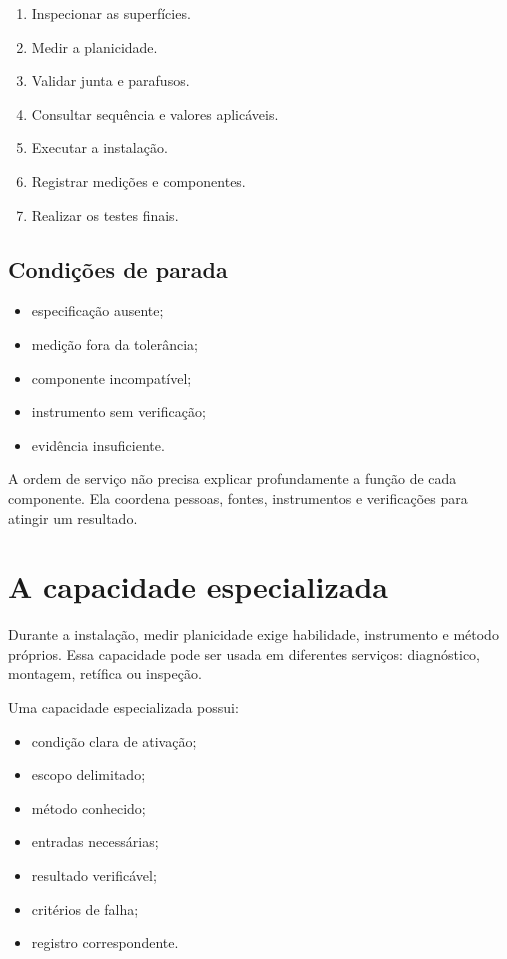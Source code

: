 \documentclass[
  10pt,
  a4paper,
  oneside]{book}
\providecommand{\tightlist}{%
  \setlength{\itemsep}{0pt}\setlength{\parskip}{0pt}}
\begin{document}
\begin{enumerate}
\def\labelenumi{\arabic{enumi}.}
\tightlist
\item
  Inspecionar as superfícies.
\item
  Medir a planicidade.
\item
  Validar junta e parafusos.
\item
  Consultar sequência e valores aplicáveis.
\item
  Executar a instalação.
\item
  Registrar medições e componentes.
\item
  Realizar os testes finais.
\end{enumerate}

\hypertarget{condiuxe7uxf5es-de-parada}{%
\subsection{Condições de parada}\label{condiuxe7uxf5es-de-parada}}

\begin{itemize}
\tightlist
\item
  especificação ausente;
\item
  medição fora da tolerância;
\item
  componente incompatível;
\item
  instrumento sem verificação;
\item
  evidência insuficiente.
\end{itemize}

A ordem de serviço não precisa explicar profundamente a função de cada
componente. Ela coordena pessoas, fontes, instrumentos e verificações
para atingir um resultado.

\hypertarget{a-capacidade-especializada}{%
\section{A capacidade especializada}\label{a-capacidade-especializada}}

Durante a instalação, medir planicidade exige habilidade, instrumento e
método próprios. Essa capacidade pode ser usada em diferentes serviços:
diagnóstico, montagem, retífica ou inspeção.

Uma capacidade especializada possui:

\begin{itemize}
\tightlist
\item
  condição clara de ativação;
\item
  escopo delimitado;
\item
  método conhecido;
\item
  entradas necessárias;
\item
  resultado verificável;
\item
  critérios de falha;
\item
  registro correspondente.
\end{itemize}
\end{document}

